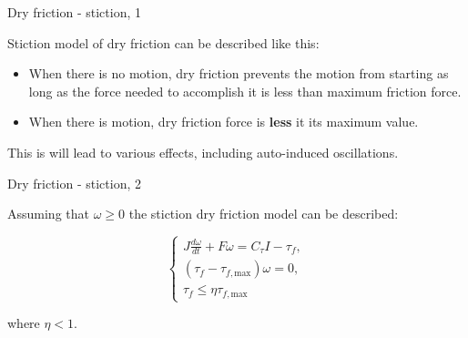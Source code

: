 \documentclass{beamer}
\begin{document}
\begin{frame}{Dry friction - stiction, 1}
	\begin{flushleft}
		
		Stiction model of dry friction can be described like this:
		
		\begin{itemize}
			\item When there is no motion, dry friction prevents the motion from starting as long as the force needed to accomplish it is less than maximum friction force.
			
			\item When there is motion, dry friction force is \textbf{less} it its maximum value.
		\end{itemize}  
		
		This is will lead to various effects, including auto-induced oscillations.
		
	\end{flushleft}
\end{frame}


\begin{frame}{Dry friction - stiction, 2}
	\begin{flushleft}
		
		Assuming that $\omega 
		\geq 0$ the stiction dry friction model can be described:
		
		\begin{equation}
			\begin{cases}
				J \frac{d \omega}{dt} + F \omega = C_\tau I - \tau_f,  \\
				(\tau_f -  \tau_{f, \text{max}}) \omega = 0, \\
				\tau_f \leq \eta \tau_{f, \text{max}}
			\end{cases}
		\end{equation}
		
		where $\eta < 1$.
		
	\end{flushleft}
\end{frame}
\end{document}

